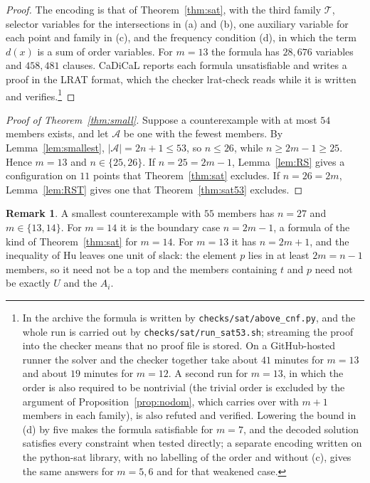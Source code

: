\documentclass[aps,prd,twocolumn,superscriptaddress,nofootinbib,longbibliography,floatfix,amsmath,amssymb,10pt]{revtex4-2}
\theoremstyle{plain}
\theoremstyle{definition}
\newtheorem{remark}[theorem]{Remark}
\theoremstyle{plain}
\newcommand{\cA}{\mathcal{A}}
\begin{document}
\begin{proof}
The encoding is that of Theorem~\ref{thm:sat}, with the third family $\mathcal T$, selector variables for the intersections in (a) and (b), one auxiliary variable for each point and family in (c), and the frequency condition (d), in which the term $d(x)$ is a sum of order variables. For $m=13$ the formula has $28{,}676$ variables and $458{,}481$ clauses. CaDiCaL reports each formula unsatisfiable and writes a proof in the LRAT format, which the checker lrat-check reads while it is written and verifies.\footnote{In the archive \cite{BB26z} the formula is written by \texttt{checks/sat/above\_cnf.py}, and the whole run is carried out by \texttt{checks/sat/run\_sat53.sh}; streaming the proof into the checker means that no proof file is stored. On a GitHub-hosted runner the solver and the checker together take about $41$ minutes for $m=13$ and about $19$ minutes for $m=12$. A second run for $m=13$, in which the order is also required to be nontrivial (the trivial order is excluded by the argument of Proposition~\ref{prop:nodom}, which carries over with $m+1$ members in each family), is also refuted and verified. Lowering the bound in (d) by five makes the formula satisfiable for $m=7$, and the decoded solution satisfies every constraint when tested directly; a separate encoding written on the python-sat library, with no labelling of the order and without (c), gives the same answers for $m=5,6$ and for that weakened case.}
\end{proof}

\begin{proof}[Proof of Theorem~\ref{thm:small}]
Suppose a counterexample with at most $54$ members exists, and let $\cA$ be one with the fewest members. By Lemma~\ref{lem:smallest}, $|\cA|=2n+1\le 53$, so $n\le 26$, while $n\ge 2m-1\ge 25$. Hence $m=13$ and $n\in\{25,26\}$. If $n=25=2m-1$, Lemma~\ref{lem:RS} gives a configuration on $11$ points that Theorem~\ref{thm:sat} excludes. If $n=26=2m$, Lemma~\ref{lem:RST} gives one that Theorem~\ref{thm:sat53} excludes.
\end{proof}

\begin{remark}\label{rem:fiftyfive}
A smallest counterexample with $55$ members has $n=27$ and $m\in\{13,14\}$. For $m=14$ it is the boundary case $n=2m-1$, a formula of the kind of Theorem~\ref{thm:sat} for $m=14$. For $m=13$ it has $n=2m+1$, and the inequality of Hu leaves one unit of slack: the element $p$ lies in at least $2m=n-1$ members, so it need not be a top and the members containing $t$ and $p$ need not be exactly $U$ and the $A_i$.
\end{remark}
\end{document}
